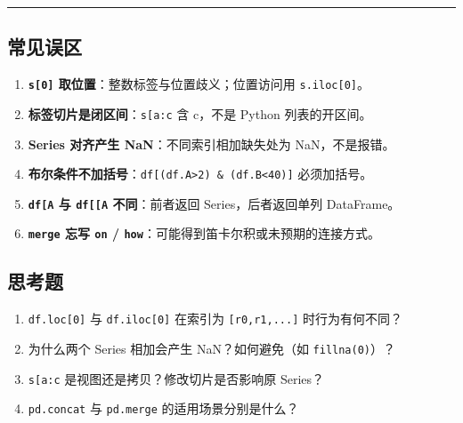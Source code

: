 \begin{center}\rule{0.5\linewidth}{0.5pt}\end{center}

\subsection{常见误区}\label{ux5e38ux89c1ux8befux533a-12}

\begin{enumerate}
\def\labelenumi{\arabic{enumi}.}
\tightlist
\item
  \textbf{\texttt{s{[}0{]}} 取位置}：整数标签与位置歧义；位置访问用
  \texttt{s.iloc{[}0{]}}。
\item
  \textbf{标签切片是闭区间}：\texttt{s{[}\textquotesingle{}a\textquotesingle{}:\textquotesingle{}c\textquotesingle{}{]}}
  含 c，不是 Python 列表的开区间。
\item
  \textbf{Series 对齐产生 NaN}：不同索引相加缺失处为 NaN，不是报错。
\item
  \textbf{布尔条件不加括号}：\texttt{df{[}(df.A\textgreater{}2)\ \&\ (df.B\textless{}40){]}}
  必须加括号。
\item
  \textbf{\texttt{df{[}\textquotesingle{}A\textquotesingle{}{]}} 与
  \texttt{df{[}{[}\textquotesingle{}A\textquotesingle{}{]}{]}}
  不同}：前者返回 Series，后者返回单列 DataFrame。
\item
  \textbf{\texttt{merge} 忘写 \texttt{on} /
  \texttt{how}}：可能得到笛卡尔积或未预期的连接方式。
\end{enumerate}

\subsection{思考题}\label{ux601dux8003ux9898-14}

\begin{enumerate}
\def\labelenumi{\arabic{enumi}.}
\tightlist
\item
  \texttt{df.loc{[}0{]}} 与 \texttt{df.iloc{[}0{]}} 在索引为
  \texttt{{[}\textquotesingle{}r0\textquotesingle{},\textquotesingle{}r1\textquotesingle{},...{]}}
  时行为有何不同？
\item
  为什么两个 Series 相加会产生 NaN？如何避免（如 \texttt{fillna(0)}）？
\item
  \texttt{s{[}\textquotesingle{}a\textquotesingle{}:\textquotesingle{}c\textquotesingle{}{]}}
  是视图还是拷贝？修改切片是否影响原 Series？
\item
  \texttt{pd.concat} 与 \texttt{pd.merge} 的适用场景分别是什么？
\end{enumerate}

